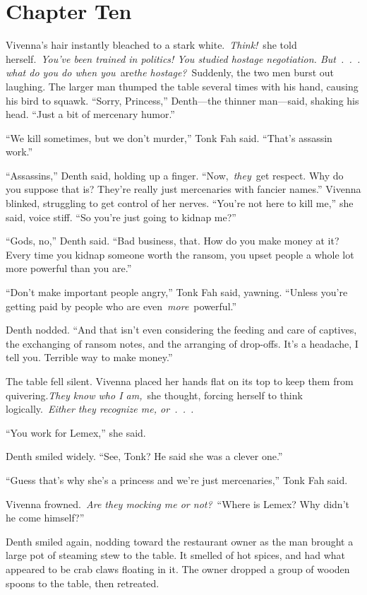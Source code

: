 \section{Chapter Ten}

Vivenna’s hair instantly bleached to a stark white.~\textit{Think!}~she told herself.~\textit{You’ve been trained in politics! You studied hostage negotiation. But~.~.~. what do you do when you}~are\textit{the hostage?}~Suddenly, the two men burst out laughing. The larger man thumped the table several times with his hand, causing his bird to squawk. “Sorry, Princess,” Denth—the thinner man—said, shaking his head. “Just a bit of mercenary humor.”

“We kill sometimes, but we don’t murder,” Tonk Fah said. “That’s assassin work.”

“Assassins,” Denth said, holding up a finger. “Now,~\textit{they}~get respect. Why do you suppose that is? They’re really just mercenaries with fancier names.” Vivenna blinked, struggling to get control of her nerves. “You’re not here to kill me,” she said, voice stiff. “So you’re just going to kidnap me?”

“Gods, no,” Denth said. “Bad business, that. How do you make money at it? Every time you kidnap someone worth the ransom, you upset people a whole lot more powerful than you are.”

“Don’t make important people angry,” Tonk Fah said, yawning. “Unless you’re getting paid by people who are even~\textit{more}~powerful.”

Denth nodded. “And that isn’t even considering the feeding and care of captives, the exchanging of ransom notes, and the arranging of drop-offs. It’s a headache, I tell you. Terrible way to make money.”

The table fell silent. Vivenna placed her hands flat on its top to keep them from quivering.\textit{They know who I am,}~she thought, forcing herself to think logically.~\textit{Either they recognize me, or~.~.~.}

“You work for Lemex,” she said.

Denth smiled widely. “See, Tonk? He said she was a clever one.”

“Guess that’s why she’s a princess and we’re just mercenaries,” Tonk Fah said.

Vivenna frowned.~\textit{Are they mocking me or not?}~“Where is Lemex? Why didn’t he come himself?”

Denth smiled again, nodding toward the restaurant owner as the man brought a large pot of steaming stew to the table. It smelled of hot spices, and had what appeared to be crab claws floating in it. The owner dropped a group of wooden spoons to the table, then retreated.

